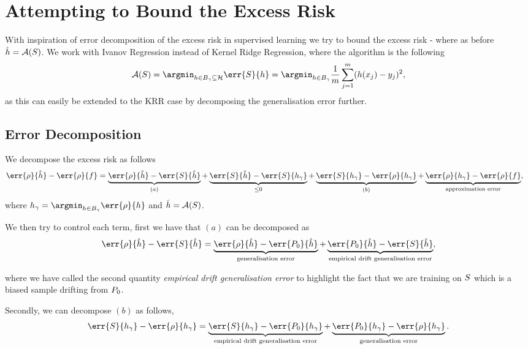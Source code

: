 \section{Attempting to Bound the Excess Risk}
With inspiration of error decomposition of the excess risk in
supervised learning we try to bound the excess risk
 - 
where as before \(\hat{h} = \mathcal{A}(S)\). We work with
Ivanov Regression instead of Kernel Ridge Regression, where the algorithm is
the following
\begin{equation}
  \label{eq:eq:ivanov-kr}
  \algo(\trainset) = \argmin_{h \in B_{\gamma} \subseteq \rkhs{H}} \err{S}{h} = \argmin_{h \in B_{\gamma}} \frac{1}{m}  \sum_{j=1}^{m}(h(x_{j}) - y_{j})^{2},
\end{equation}
as this can easily be extended to the KRR case by decomposing the generalisation
error further.

\subsection{Error Decomposition}
\label{sec:error-decomposition}
We decompose the excess risk as follows
\begin{align*}
  \err{\rho}{\hat{h}} - \err{\rho}{f} & = \underbrace{\err{\rho}{\hat{h}} - \err{\trainset}{\hat{h}}}_{(a)} + \underbrace{\err{\trainset}{\hat{h}} - \err{\trainset}{h_{\gamma}}}_{\leq 0} + \underbrace{\err{\trainset}{h_{\gamma}} - \err{\rho}{h_{\gamma}}}_{(b)} + \underbrace{\err{\rho}{h_{\gamma}} - \err{\rho}{f}}_{\text{approximation error}},
\end{align*}
where \(h_{\gamma} = \argmin_{h \in B_{\gamma}} \err{\rho}{h}\) and
\(\hat{h} = \mathcal{A}(S)\).

We then try to control each term, first we have that \((a)\) can be decomposed
as 
\begin{equation*}
  \err{\rho}{\hat{h}} - \err{\trainset}{\hat{h}} = \underbrace{\err{\rho}{\hat{h}} - \err{\poolset_0}{\hat{h}}}_{\text{generalisation error}} + \underbrace{\err{\poolset_0}{\hat{h}} - \err{\trainset}{\hat{h}}}_{\text{empirical drift generalisation error}},
\end{equation*}

where we have called the second quantity \emph{empirical drift generalisation error} to highlight the fact that we are training on \(S\) which is a
biased sample drifting from \(P_0\).

Secondly, we can decompose \((b)\) as follows,
\begin{equation*}
  \err{\trainset}{h_{\gamma}} - \err{\rho}{h_{\gamma}} = \underbrace{\err{\trainset}{h_{\gamma}} - \err{\poolset_0}{h_{\gamma}}}_{\text{empirical drift generalisation error}} +\underbrace{\err{\poolset_0}{h_{\gamma}} - \err{\rho}{h_{\gamma}}}_{\text{generalisation error}}.
\end{equation*}

